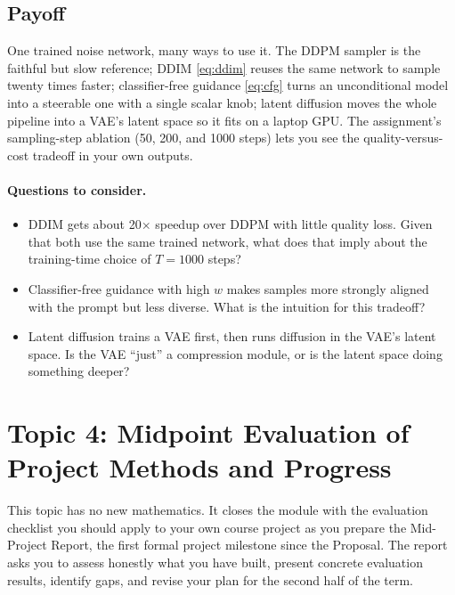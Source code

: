 \documentclass[11pt]{article}
\theoremstyle{remark}
\begin{document}
\subsection{Payoff}

One trained noise network, many ways to use it. The DDPM sampler is the faithful but slow reference; DDIM \eqref{eq:ddim} reuses the same network to sample twenty times faster; classifier-free guidance \eqref{eq:cfg} turns an unconditional model into a steerable one with a single scalar knob; latent diffusion moves the whole pipeline into a VAE's latent space so it fits on a laptop GPU. The assignment's sampling-step ablation (50, 200, and 1000 steps) lets you see the quality-versus-cost tradeoff in your own outputs.

\paragraph{Questions to consider.}
\begin{itemize}[leftmargin=1.5em]
\item DDIM gets about 20$\times$ speedup over DDPM with little quality loss. Given that both use the same trained network, what does that imply about the training-time choice of $T = 1000$ steps?
\item Classifier-free guidance with high $w$ makes samples more strongly aligned with the prompt but less diverse. What is the intuition for this tradeoff?
\item Latent diffusion trains a VAE first, then runs diffusion in the VAE's latent space. Is the VAE ``just'' a compression module, or is the latent space doing something deeper?
\end{itemize}

\section{Topic 4: Midpoint Evaluation of Project Methods and Progress}

This topic has no new mathematics. It closes the module with the evaluation checklist you should apply to your own course project as you prepare the Mid-Project Report, the first formal project milestone since the Proposal. The report asks you to assess honestly what you have built, present concrete evaluation results, identify gaps, and revise your plan for the second half of the term.
\end{document}
